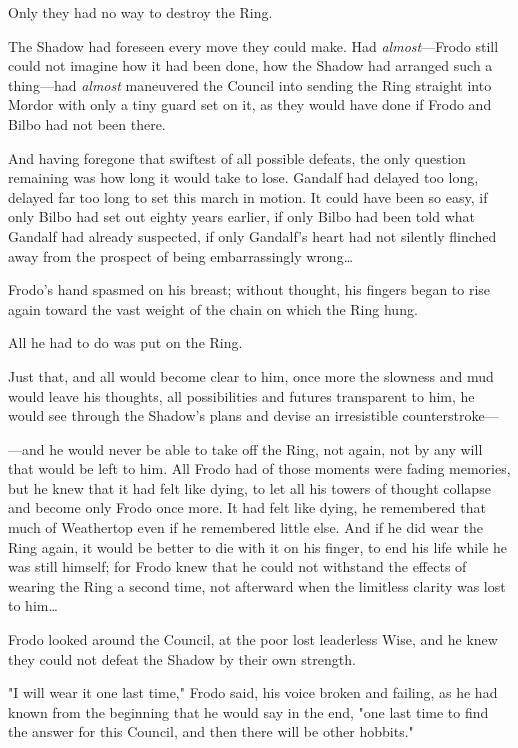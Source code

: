 Only they had no way to destroy the Ring.

The Shadow had foreseen every move they could make. Had \emph{almost}---Frodo
still could not imagine how it had been done, how the Shadow had arranged such
a thing---had \emph{almost} maneuvered the Council into sending the Ring
straight into Mordor with only a tiny guard set on it, as they would have done
if Frodo and Bilbo had not been there.

And having foregone that swiftest of all possible defeats, the only question
remaining was how long it would take to lose. Gandalf had delayed too long,
delayed far too long to set this march in motion. It could have been so easy,
if only Bilbo had set out eighty years earlier, if only Bilbo had been told
what Gandalf had already suspected, if only Gandalf's heart had not silently
flinched away from the prospect of being embarrassingly wrong{\ldots}

Frodo's hand spasmed on his breast; without thought, his fingers began to rise
again toward the vast weight of the chain on which the Ring hung.

All he had to do was put on the Ring.

Just that, and all would become clear to him, once more the slowness and mud
would leave his thoughts, all possibilities and futures transparent to him, he
would see through the Shadow's plans and devise an irresistible counterstroke---

---and he would never be able to take off the Ring, not again, not by any will
that would be left to him. All Frodo had of those moments were fading memories,
but he knew that it had felt like dying, to let all his towers of thought
collapse and become only Frodo once more. It had felt like dying, he remembered
that much of Weathertop even if he remembered little else. And if he did wear
the Ring again, it would be better to die with it on his finger, to end his
life while he was still himself; for Frodo knew that he could not withstand the
effects of wearing the Ring a second time, not afterward when the limitless
clarity was lost to him{\ldots}

Frodo looked around the Council, at the poor lost leaderless Wise, and he knew
they could not defeat the Shadow by their own strength.

"I will wear it one last time," Frodo said, his voice broken and failing, as he
had known from the beginning that he would say in the end, "one last time to
find the answer for this Council, and then there will be other hobbits."

